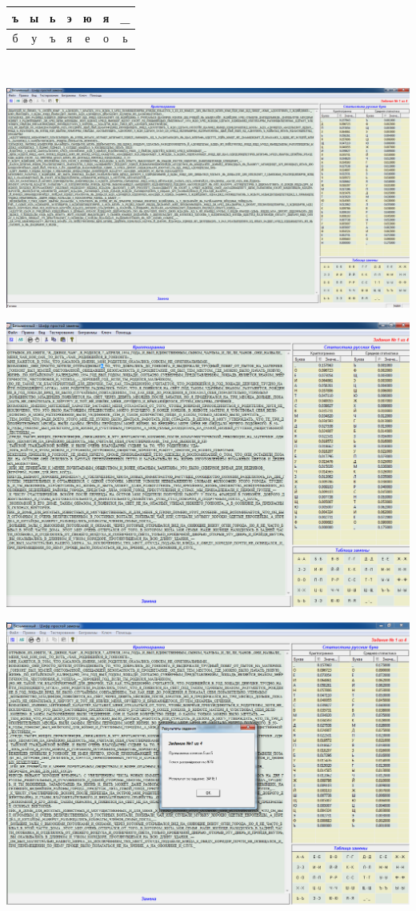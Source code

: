 \documentclass[a4paper,14pt]{extarticle}
\begin{document}
    \begin{tabular}{|c|c|c|c|c|c|c|}
        \hline
        ъ & ы & ь & э & ю & я & \_ \\
        \hline
        б & у & ъ & я & е & о & ь \\
        \hline
    \end{tabular}\\

    \begin{center}
        \includegraphics[scale=0.3]{pics/2.png}
    \end{center}
    \begin{center}
        \includegraphics[scale=0.3]{pics/2_1.png}
    \end{center}
    \begin{center}
        \includegraphics[scale=0.3]{pics/2_2.png}
    \end{center}
\end{document}
